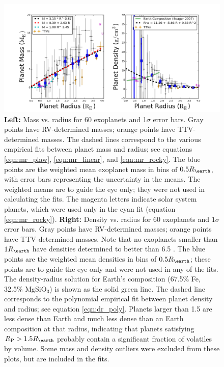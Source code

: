 \documentclass[iop]{emulateapj}
\begin{document}
\begin{figure}[htbp] %
   \centering
    \includegraphics[width=6in]{mr_small.png} 
   \caption{\small \textbf{Left:} Mass vs. radius for 60 exoplanets and 1$\sigma$ error bars.  Gray points  have RV-determined masses; orange points have TTV-determined masses.  The dashed lines correspond to the various empirical fits between planet mass and radius; see equations \ref{eqn:mr_plaw}, \ref{eqn:mr_linear}, and \ref{eqn:mr_rocky}.  The blue points are the weighted mean exoplanet mass in bins of $0.5 \rearth$, with error bars representing the uncertainty in the means.  The weighted means are to guide the eye only; they were not used in calculating the fits.  The magenta letters indicate solar system planets, which were used only in the cyan fit (equation \ref{eqn:mr_rocky}).  \textbf{Right:} Density vs. radius for 60 exoplanets and $1\sigma$ error bars.  Gray points  have RV-determined masses; orange points have TTV-determined masses.  Note that no exoplanets smaller than $1\rearth$ have densities determined to better than 6.5 \gcc.  The blue points are the weighted mean densities in bins of $0.5 \rearth$; these points are to guide the eye only and were not used in any of the fits.  The \citet{Seager2007} density-radius solution for Earth's composition (67.5\% Fe, 32.5\% MgSiO$_3$) is shown as the solid green line.  The dashed line corresponds to the polynomial empirical fit between planet density and radius; see equation \ref{eqn:dr_poly}.  Planets larger than 1.5 \rearth are less dense than Earth and much less dense than an Earth composition at that radius, indicating that planets satisfying $\rpl > 1.5 \rearth$ probably contain a significant fraction of volatiles by volume.  Some mass and density outliers were excluded from these plots, but are included in the fits.}
   \label{fig:rm_4}
\end{figure}
\end{document}
